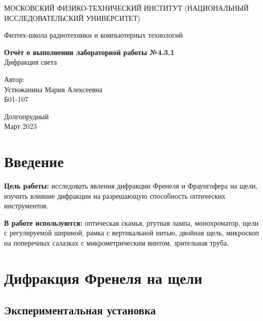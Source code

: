 \documentclass[a4paper,12pt]{article} %
\date{\today}
\begin{document}
\begin{titlepage}
  \begin{center}
    {\large МОСКОВСКИЙ ФИЗИКО-ТЕХНИЧЕСКИЙ ИНСТИТУТ (НАЦИОНАЛЬНЫЙ ИССЛЕДОВАТЕЛЬСКИЙ УНИВЕРСИТЕТ)}
  \end{center}
  \begin{center}
    {\large Физтех-школа радиотехники и компьютерных технологий}
  \end{center}
  
  
  \vspace{4.5cm}
  {\huge
    \begin{center}
      {\bf Отчёт о выполнении лабораторной работы №4.3.1}\\
      Дифракция света
    \end{center}
  }
  \vspace{2cm}
  \begin{flushright}
    {\LARGE Автор:\\ Устюжанина Мария Алексеевна \\
      \vspace{0.2cm}
      Б01-107}
  \end{flushright}
  \vspace{8cm}
  \begin{center}
    Долгопрудный\\
    Март 2023
  \end{center}
\end{titlepage}

\section{Введение}


\par \textbf{Цель работы:} исследовать явления дифракции Френеля и Фраунгофера на щели, изучить влияние дифракции на разрешающую способность оптических инструментов.

\textbf{В работе используются:} оптическая скамья, ртутная лампа, монохроматор, щели с регулируемой шириной, рамка с вертикальной нитью, двойная щель, микроскоп на поперечных салазках с микрометрическим винтом, зрительная труба.

\section{Дифракция Френеля на щели}

\subsection{Экспериментальная установка}
\end{document}
